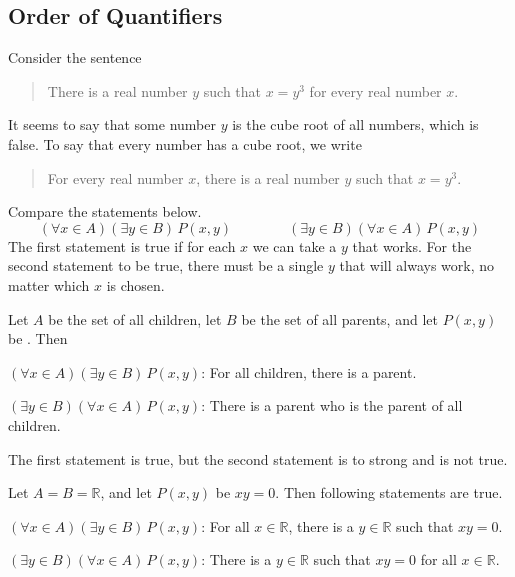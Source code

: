 \subsection{Order of Quantifiers}

\begin{eg}
Consider the sentence
\begin{quote}
There is a real number $y$ such that $x=y^3$ for every real number $x$.
\end{quote}
It seems to say that some number $y$ is the cube root of all numbers,
which is false.
To say that every number has a cube root, we write
\begin{quote}
For every real number $x$, there is a real number $y$ such that $x=y^3$.
\end{quote}
\end{eg}


Compare the statements below.
\[
(\forall x\in A)(\exists y\in B)\, P(x,y) \qquad\qquad (\exists y\in B)(\forall x\in A)\, P(x,y)
\]
The first statement is true if for each $x$ we can take a $y$ that works.
For the second statement to be true,
there must be a single $y$ that will always work,
no matter which $x$ is chosen.

\begin{eg}
Let $A$ be the set of all children, let $B$ be the set of all parents,
and let $P(x,y)$ be .
Then
\begin{myEnum}
\item $(\forall x\in A)(\exists y\in B)\, P(x,y)$:
For all children, there is a parent.
\item $(\exists y\in B)(\forall x\in A)\, P(x,y)$:
There is a parent who is the parent of all children.
\end{myEnum}
The first statement is true, but the second statement is to strong and is not true.
\end{eg}


\begin{eg}
Let $A=B=\mathbb{R}$, and let $P(x,y)$ be $xy=0$.
Then following statements are true.
\begin{myEnum}
\item $(\forall x\in A)(\exists y\in B)\, P(x,y)$:
For all $x\in\mathbb{R}$, there is a $y\in\mathbb{R}$ such that $xy=0$.
\item $(\exists y\in B)(\forall x\in A)\, P(x,y)$:
There is a $y\in\mathbb{R}$ such that $xy=0$ for all $x\in\mathbb{R}$.
\end{myEnum}
\end{eg}



